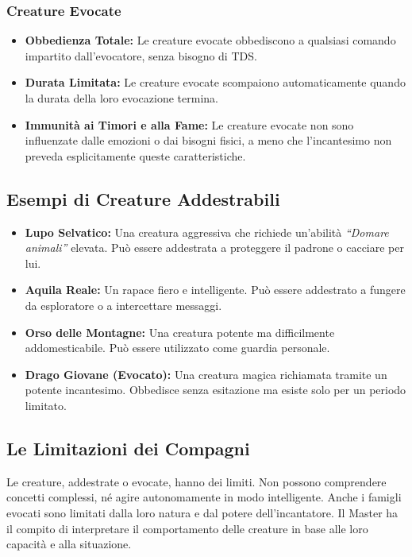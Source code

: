 \documentclass[../manuale_main.tex]{subfiles}
\begin{document}
\subsubsection{Creature Evocate}
\begin{itemize}
    \item \textbf{Obbedienza Totale:} Le creature evocate obbediscono a qualsiasi comando impartito dall'evocatore, senza bisogno di TDS.
    \item \textbf{Durata Limitata:} Le creature evocate scompaiono automaticamente quando la durata della loro evocazione termina.
    \item \textbf{Immunità ai Timori e alla Fame:} Le creature evocate non sono influenzate dalle emozioni o dai bisogni fisici, a meno che l'incantesimo non preveda esplicitamente queste caratteristiche.
\end{itemize}

\subsection*{Esempi di Creature Addestrabili}

\begin{itemize}
    \item \textbf{Lupo Selvatico:} Una creatura aggressiva che richiede un'abilità \emph{``Domare animali''} elevata. Può essere addestrata a proteggere il padrone o cacciare per lui.
    \item \textbf{Aquila Reale:} Un rapace fiero e intelligente. Può essere addestrato a fungere da esploratore o a intercettare messaggi.
    \item \textbf{Orso delle Montagne:} Una creatura potente ma difficilmente addomesticabile. Può essere utilizzato come guardia personale.
    \item \textbf{Drago Giovane (Evocato):} Una creatura magica richiamata tramite un potente incantesimo. Obbedisce senza esitazione ma esiste solo per un periodo limitato.
\end{itemize}

\subsection*{Le Limitazioni dei Compagni}
Le creature, addestrate o evocate, hanno dei limiti. Non possono comprendere concetti complessi, né agire autonomamente in modo intelligente. Anche i famigli evocati sono limitati dalla loro natura e dal potere dell'incantatore. Il Master ha il compito di interpretare il comportamento delle creature in base alle loro capacità e alla situazione.
\end{document}
